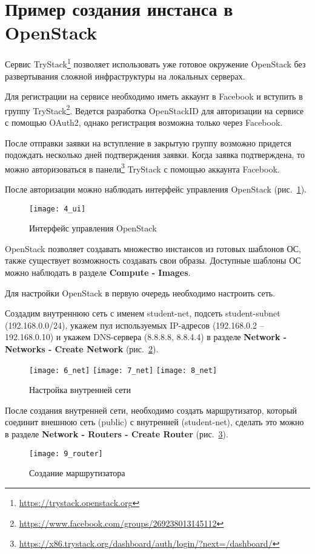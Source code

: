 \section{Пример создания инстанса в OpenStack} \label{pril:f}

Сервис TryStack\footnote{\url{https://trystack.openstack.org}} позволяет использовать уже готовое окружение OpenStack без развертывания сложной инфраструктуры на локальных серверах.

Для регистрации на сервисе необходимо иметь аккаунт в Facebook и вступить в группу TryStack\footnote{\url{https://www.facebook.com/groups/269238013145112}}.
Ведется разработка OpenStackID для авторизации на сервисе с помощью OAuth2, однако регистрация возможна только через Facebook.

После отправки заявки на вступление в закрытую группу возможно придется подождать несколько дней подтверждения заявки.
Когда заявка подтверждена, то можно авторизоваться в панели\footnote{\url{https://x86.trystack.org/dashboard/auth/login/?next=/dashboard/}} TryStack с помощью аккаунта Facebook.

После авторизации можно наблюдать интерфейс управления OpenStack (рис.~\ref{pic:ui}).
\begin{figure}[ht]
    \centering
    \texttt{[image: 4\_ui]}
    \caption{Интерфейс управления OpenStack}\label{pic:ui}
\end{figure}

OpenStack позволяет создавать множество инстансов из готовых шаблонов ОС, также существует возможность создавать свои образы.
Доступные шаблоны ОС можно наблюдать в разделе \textbf{Compute - Images}.

Для настройки OpenStack в первую очередь необходимо настроить сеть.

Создадим внутреннюю сеть с именем student-net, подсеть student-subnet (192.168.0.0/24), укажем пул используемых IP-адресов (192.168.0.2 -- 192.168.0.10) и укажем DNS-сервера (8.8.8.8, 8.8.4.4) в разделе \textbf{Network - Networks - Create Network} (рис.~\ref{pic:net}).
\begin{figure}[ht]
    \centering
    \texttt{[image: 6\_net]}
    \texttt{[image: 7\_net]}
    \texttt{[image: 8\_net]}
    \caption{Настройка внутренней сети}\label{pic:net}
\end{figure}

\clearpage

После создания внутренней сети, необходимо создать маршрутизатор, который соединит внешнюю сеть (public) с внутренней (student-net), сделать это можно в разделе \textbf{Network - Routers - Create Router} (рис.~\ref{pic:router}).
\begin{figure}[ht]
    \centering
    \texttt{[image: 9\_router]}
    \caption{Создание маршрутизатора}\label{pic:router}
\end{figure}

